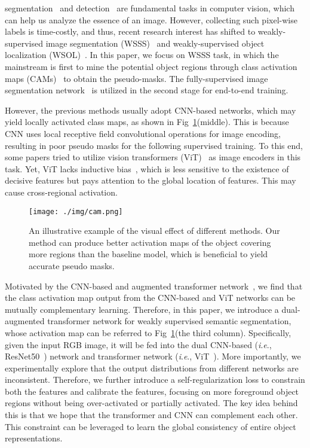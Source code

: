 \documentclass[journal]{IEEEtran}
\newcommand{\ie}{\textit{i}.\textit{e}., }
\begin{document}
 segmentation~\cite{chen2014semantic,lin2017refinenet} and detection~\cite{tian2019fcos,su2022epnet} are fundamental tasks in computer vision, which can help us analyze the essence of an image. However, collecting such pixel-wise labels is time-costly, and thus, recent research interest has shifted to weakly-supervised image segmentation (WSSS)~\cite{wang2020self,su2021context,huo2022dual} and weakly-supervised object localization (WSOL)~\cite{su2022self, cao2023semantic}. In this paper, we focus on WSSS task, in which the mainstream is first to mine the potential object regions through class activation maps (CAMs)~\cite{zhou2016learning} to obtain the pseudo-masks. The fully-supervised image segmentation network~\cite{chen2017deeplab,chen2018encoder,sun2023denet} is utilized in the second stage for end-to-end training.

However, the previous methods usually adopt CNN-based networks, which may yield locally activated class maps, as shown in Fig~\ref{fig1}(middle). This is because CNN uses local receptive field convolutional operations for image encoding, resulting in poor pseudo masks for the following supervised training.
To this end, some papers tried to utilize vision transformers (ViT)~\cite{dosovitskiy2020image} as image encoders in this task. Yet, ViT lacks inductive bias~\cite{goyal2020inductive}, which is less sensitive to the existence of decisive features but pays attention to the global location of features. This may cause cross-regional activation.


\begin{figure}
	\begin{center}
		\centering
		\texttt{[image: ./img/cam.png]}
	\end{center}
	\caption{An illustrative example of the visual effect of different methods. Our method can produce better activation maps of the object covering more regions than the baseline model, which is beneficial to yield accurate pseudo masks.}
	\label{fig1}
	\vspace{-8pt}
\end{figure}

Motivated by the CNN-based and augmented transformer network~\cite{peng2021conformer}, we find that the class activation map output from the CNN-based and ViT networks can be mutually complementary learning.
Therefore, in this paper, we introduce a dual-augmented transformer network for weakly supervised semantic segmentation, whose activation map can be referred to Fig~\ref{fig1}(the third column). Specifically, given the input RGB image, it will be fed into the dual CNN-based (\ie ResNet50~\cite{he2016deep}) network and transformer network (\ie ViT~\cite{dosovitskiy2020image}).
More importantly, we experimentally explore that the output distributions from different networks are inconsistent. Therefore, we further introduce a self-regularization loss to constrain both the features and calibrate the features, focusing on more foreground object regions without being over-activated or partially activated. The key idea behind this is that we hope that the transformer and CNN can complement each other. This constraint can be leveraged to learn the global consistency of entire object representations.
\end{document}
